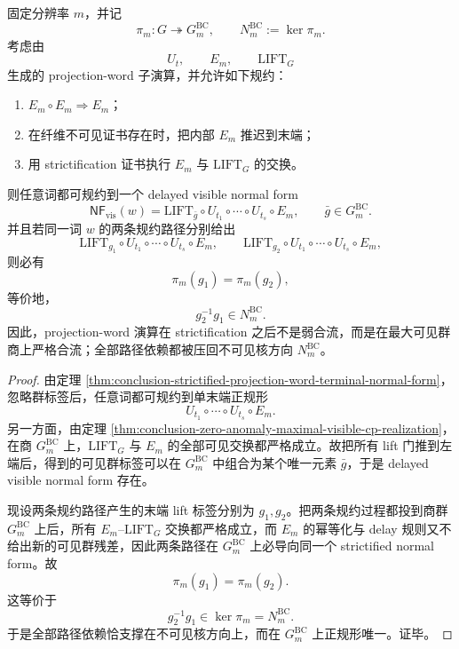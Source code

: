 \begin{theorem}\label{thm:conclusion-strictified-projection-word-confluence-on-visible-quotient}
固定分辨率 \(m\)，并记
\[
\pi_m:G\twoheadrightarrow G_m^{\mathrm{BC}},
\qquad
N_m^{\mathrm{BC}}:=\ker\pi_m.
\]
考虑由
\[
U_t,\qquad E_m,\qquad \mathrm{LIFT}_G
\]
生成的 projection-word 子演算，并允许如下规约：
\begin{enumerate}
  \item \(E_m\circ E_m\Rightarrow E_m\)；
  \item 在纤维不可见证书存在时，把内部 \(E_m\) 推迟到末端；
  \item 用 strictification 证书执行 \(E_m\) 与 \(\mathrm{LIFT}_G\) 的交换。
\end{enumerate}
则任意词都可规约到一个 delayed visible normal form
\[
\mathsf{NF}_{\mathrm{vis}}(w)
=
\mathrm{LIFT}_{\bar g}\circ U_{t_1}\circ\cdots\circ U_{t_s}\circ E_m,
\qquad
\bar g\in G_m^{\mathrm{BC}}.
\]
并且若同一词 \(w\) 的两条规约路径分别给出
\[
\mathrm{LIFT}_{g_1}\circ U_{t_1}\circ\cdots\circ U_{t_s}\circ E_m,
\qquad
\mathrm{LIFT}_{g_2}\circ U_{t_1}\circ\cdots\circ U_{t_s}\circ E_m,
\]
则必有
\[
\pi_m(g_1)=\pi_m(g_2),
\]
等价地，
\[
g_2^{-1}g_1\in N_m^{\mathrm{BC}}.
\]
因此，projection-word 演算在 strictification 之后不是弱合流，而是在最大可见群商上严格合流；全部路径依赖都被压回不可见核方向 \(N_m^{\mathrm{BC}}\)。
\end{theorem}
\begin{proof}
由定理 \ref{thm:conclusion-strictified-projection-word-terminal-normal-form}，忽略群标签后，任意词都可规约到单末端正规形
\[
U_{t_1}\circ\cdots\circ U_{t_s}\circ E_m.
\]
另一方面，由定理 \ref{thm:conclusion-zero-anomaly-maximal-visible-cp-realization}，在商 \(G_m^{\mathrm{BC}}\) 上，\(\mathrm{LIFT}_G\) 与 \(E_m\) 的全部可见交换都严格成立。故把所有 lift 门推到左端后，得到的可见群标签可以在 \(G_m^{\mathrm{BC}}\) 中组合为某个唯一元素 \(\bar g\)，于是 delayed visible normal form 存在。

现设两条规约路径产生的末端 lift 标签分别为 \(g_1,g_2\)。把两条规约过程都投到商群 \(G_m^{\mathrm{BC}}\) 上后，所有 \(E_m\)–\(\mathrm{LIFT}_G\) 交换都严格成立，而 \(E_m\) 的幂等化与 delay 规则又不给出新的可见群残差，因此两条路径在 \(G_m^{\mathrm{BC}}\) 上必导向同一个 strictified normal form。故
\[
\pi_m(g_1)=\pi_m(g_2).
\]
这等价于
\[
g_2^{-1}g_1\in\ker\pi_m=N_m^{\mathrm{BC}}.
\]
于是全部路径依赖恰支撑在不可见核方向上，而在 \(G_m^{\mathrm{BC}}\) 上正规形唯一。证毕。
\end{proof}
